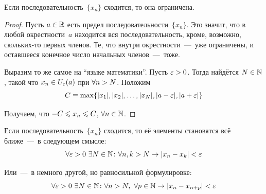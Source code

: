 \documentclass[a4paper,12pt]{article}
\begin{document}
  \begin{proposition}
    Если последовательность~$\{x_n\}$ сходится, то она ограничена.
  \end{proposition}
  
  \begin{proof}
    Пусть $a \hm\in \RR$ есть предел последовательности~$\{x_n\}$.
    Это значит, что в любой окрестности~$a$ находится вся последовательность, кроме, возможно, скольких-то первых членов.
    Те, что внутри окрестности~---~уже ограничены, и оставшееся конечное число начальных членов~---~тоже.
    
    Выразим то же самое на ``языке математики''.
    Пусть $\eps \hm> 0$.
    Тогда найдётся $N \hm\in \NN$, такой что $x_n \hm\in U_{\eps}(a)$ при $\forall n \hm> N$.
    Положим
    \[
      C \equiv \max\{|x_1|, |x_2|, \ldots, |x_{N}|, |a - \varepsilon|, |a + \varepsilon|\}
    \]
    
    Получаем, что ${-}C \hm\leq x_n \hm\leq C$, $\forall n \in \mathbb N$.
  \end{proof}

  \begin{proposition}
    Если последовательность~$\{x_n\}$ сходится, то её элементы становятся всё ближе~---~в следующем смысле:
    \[
      \forall \varepsilon > 0\ \exists N \in \mathbb N\colon \forall n, k > N \to |x_n - x_k| < \varepsilon
    \]
    
    Или~---~в немного другой, но равносильной формулировке:
    \[
      \forall \varepsilon > 0\ \exists N \in \mathbb N\colon \forall n > N,\ \forall p \in \mathbb N \to |x_n - x_{n + p}| < \varepsilon
    \]
  \end{proposition}
  
  
\end{document}
